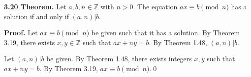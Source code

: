 \documentclass[12pt]{article}
\begin{document}
\noindent\textbf{3.20 Theorem.} Let $a,b,n\in\mathbb{Z}$ with $n>0$. The equation $ax\equiv b\pmod n$ has a solution if and only if $(a,n)|b$.

\bigskip

\noindent\textbf{Proof.} Let $ax\equiv b\pmod n$ be given such that it has a solution. By Theorem 3.19, there exists $x,y\in\mathbb{Z}$ such that $ax+ny=b$. By Theorem 1.48, $(a,n)|b$. 

\bigskip

\noindent Let $(a,n)|b$ be given. By Theorem 1.48, there exists integers $x,y$ such that $ax+ny=b$. By Theorem 3.19, $ax\equiv b\pmod n$.\qed
\end{document}

